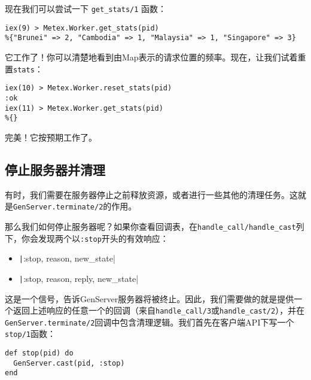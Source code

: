 现在我们可以尝试一下 \texttt{get\_stats/1} 函数：

\begin{code}{}
\begin{verbatim}
iex(9) > Metex.Worker.get_stats(pid)
%{"Brunei" => 2, "Cambodia" => 1, "Malaysia" => 1, "Singapore" => 3}
\end{verbatim}
\end{code}

它工作了！你可以清楚地看到由Map表示的请求位置的频率。现在，让我们试着重置\texttt{stats}：

\begin{code}{}
\begin{verbatim}
iex(10) > Metex.Worker.reset_stats(pid)
:ok
iex(11) > Metex.Worker.get_stats(pid)
%{}
\end{verbatim}
\end{code}

完美！它按预期工作了。


\subsection{停止服务器并清理}

有时，我们需要在服务器停止之前释放资源，或者进行一些其他的清理任务。这就是\texttt{GenServer.terminate/2}的作用。

那么我们如何停止服务器呢？如果你查看回调表，在\texttt{handle\_call/handle\_cast}列下，你会发现两个以\texttt{:stop}开头的有效响应：

\begin{itemize}
\item  \texttt|{:stop, reason, new_state}|
\item  \texttt|{:stop, reason, reply, new_state}|
\end{itemize}

这是一个信号，告诉GenServer服务器将被终止。因此，我们需要做的就是提供一个返回上述响应的任意一个的回调（来自\texttt{handle\_call/3}或\texttt{handle\_cast/2}），并在\texttt{GenServer.terminate/2}回调中包含清理逻辑。我们首先在客户端API下写一个\texttt{stop/1}函数：

\begin{code}{}
\begin{verbatim}
def stop(pid) do
  GenServer.cast(pid, :stop)
end
\end{verbatim}
\end{code}

